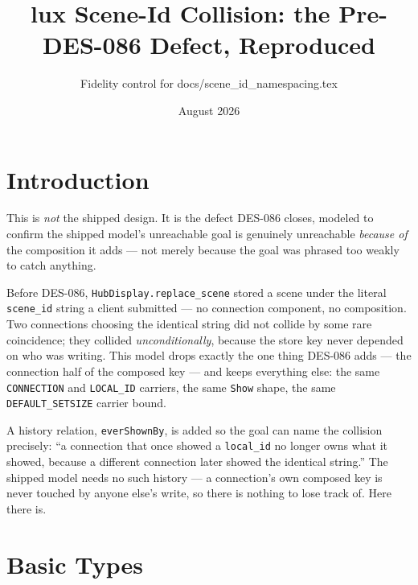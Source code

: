 \documentclass[a4paper,10pt,fleqn]{article}
\begin{document}
\title{lux Scene-Id Collision: the Pre-DES-086 Defect, Reproduced}
\author{Fidelity control for docs/scene\_id\_namespacing.tex}
\date{August 2026}
\maketitle

\section{Introduction}

This is \emph{not} the shipped design. It is the defect DES-086 closes,
modeled to confirm the shipped model's unreachable goal is genuinely
unreachable \emph{because of} the composition it adds --- not merely because
the goal was phrased too weakly to catch anything.

Before DES-086, \texttt{HubDisplay.replace\_scene} stored a scene under the
literal \texttt{scene\_id} string a client submitted --- no connection
component, no composition. Two connections choosing the identical string did
not collide by some rare coincidence; they collided \emph{unconditionally},
because the store key never depended on who was writing. This model drops
exactly the one thing DES-086 adds --- the connection half of the composed
key --- and keeps everything else: the same \texttt{CONNECTION} and
\texttt{LOCAL\_ID} carriers, the same \texttt{Show} shape, the same
\texttt{DEFAULT\_SETSIZE} carrier bound.

A history relation, \texttt{everShownBy}, is added so the goal can name the
collision precisely: ``a connection that once showed a \texttt{local\_id} no
longer owns what it showed, because a different connection later showed the
identical string.'' The shipped model needs no such history --- a
connection's own composed key is never touched by anyone else's write, so
there is nothing to lose track of. Here there is.

\section{Basic Types}

\begin{zed}
\end{zed}
\end{document}
